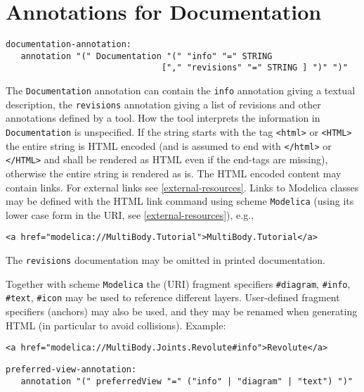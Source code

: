 \section{Annotations for Documentation}\label{annotations-for-documentation}

\begin{lstlisting}[language=grammar]
documentation-annotation:
   annotation "(" Documentation "(" "info" "=" STRING
                               ["," "revisions" "=" STRING ] ")" ")"
\end{lstlisting}
The \lstinline!Documentation! annotation can contain the \lstinline!info! annotation
giving a textual description, the \lstinline!revisions! annotation giving a list
of revisions and other annotations defined by a tool.
How the tool interprets the information in \lstinline!Documentation! is
unspecified. If the string starts with the tag
\lstinline!<html>! or \lstinline!<HTML>! the entire string is HTML encoded
(and is assumed to end with \lstinline!</html>! or \lstinline!</HTML>! and shall
be rendered as HTML even if the end-tags are missing),
otherwise the entire string is rendered as is.
The HTML encoded content may contain links. For external
links see \cref{external-resources}. Links to Modelica classes may be defined with
the HTML link command using scheme \lstinline!Modelica!
(using its lower case form in the URI, see \cref{external-resources}), e.g.,
\begin{lstlisting}[language=modelica]
<a href="modelica://MultiBody.Tutorial">MultiBody.Tutorial</a>
\end{lstlisting}

\begin{nonnormative}
The \lstinline!revisions! documentation may be omitted in printed documentation.
\end{nonnormative}

Together with scheme \lstinline!Modelica! the (URI) fragment specifiers
\lstinline!#diagram!, \lstinline!#info!, \lstinline!#text!, \lstinline!#icon! may be used to reference different
layers. User-defined fragment specifiers (anchors) may also be used, and they may be renamed
when generating HTML (in particular to avoid collisions).
Example:
\begin{lstlisting}[language=modelica]
<a href="modelica://MultiBody.Joints.Revolute#info">Revolute</a>
\end{lstlisting}
\begin{lstlisting}[language=grammar]
preferred-view-annotation:
   annotation "(" preferredView "=" ("info" | "diagram" | "text") ")"
\end{lstlisting}

